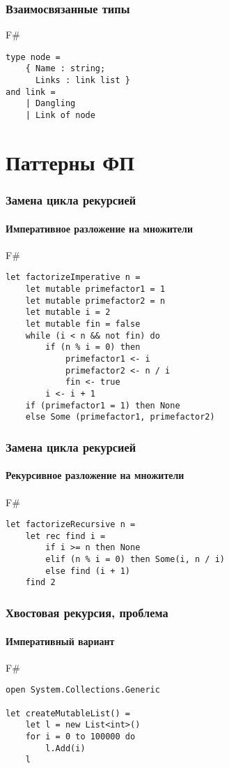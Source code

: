 \documentclass[xetex,mathserif,serif]{beamer}
\begin{document}
	\begin{frame}[fragile]
		\frametitle{Взаимосвязанные типы}
		\begin{exampleblock}{F\#}
			\begin{lstlisting}
type node =
    { Name : string;
      Links : link list }
and link =
    | Dangling
    | Link of node
\end{lstlisting}
\end{exampleblock}
		
\end{frame}

	\section{Паттерны ФП}

	\begin{frame}[fragile]
		\frametitle{Замена цикла рекурсией}
		\framesubtitle{Императивное разложение на множители}
		\begin{exampleblock}{F\#}
			\begin{lstlisting}
let factorizeImperative n =
    let mutable primefactor1 = 1
    let mutable primefactor2 = n
    let mutable i = 2
    let mutable fin = false
    while (i < n && not fin) do
        if (n % i = 0) then
            primefactor1 <- i
            primefactor2 <- n / i
            fin <- true
        i <- i + 1
    if (primefactor1 = 1) then None
    else Some (primefactor1, primefactor2)
\end{lstlisting}
\end{exampleblock}

\end{frame}

	\begin{frame}[fragile]
		\frametitle{Замена цикла рекурсией}
		\framesubtitle{Рекурсивное разложение на множители}
		\begin{exampleblock}{F\#}
			\begin{lstlisting}
let factorizeRecursive n =
    let rec find i =
        if i >= n then None
        elif (n % i = 0) then Some(i, n / i)
        else find (i + 1)
    find 2
\end{lstlisting}
\end{exampleblock}
		
\end{frame}

\begin{frame}[fragile]
	\frametitle{Хвостовая рекурсия, проблема}
	\framesubtitle{Императивный вариант}
	\begin{exampleblock}{F\#}
		\begin{lstlisting}
open System.Collections.Generic

let createMutableList() =
    let l = new List<int>()
    for i = 0 to 100000 do
        l.Add(i)
    l
\end{lstlisting}
\end{exampleblock}
	
\end{frame}
\end{document}
